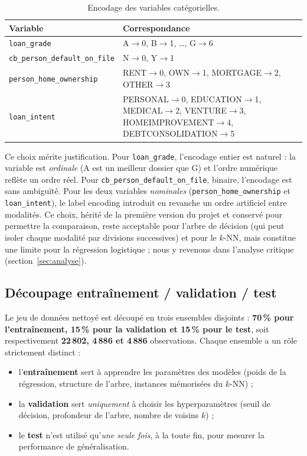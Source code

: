 \begin{table}[H]
  \centering
  \caption{Encodage des variables catégorielles.}
  \label{tab:encodage}
  \small
  \begin{tabular}{lp{8.5cm}}
    \toprule
    \textbf{Variable} & \textbf{Correspondance} \\
    \midrule
    \texttt{loan\_grade} & A$\to$0, B$\to$1, \ldots, G$\to$6 \\
    \texttt{cb\_person\_default\_on\_file} & N$\to$0, Y$\to$1 \\
    \texttt{person\_home\_ownership} & RENT$\to$0, OWN$\to$1, MORTGAGE$\to$2, OTHER$\to$3 \\
    \texttt{loan\_intent} & PERSONAL$\to$0, EDUCATION$\to$1, MEDICAL$\to$2,
      VENTURE$\to$3, HOMEIMPROVEMENT$\to$4, DEBTCONSOLIDATION$\to$5 \\
    \bottomrule
  \end{tabular}
\end{table}

Ce choix mérite justification. Pour \texttt{loan\_grade}, l'encodage entier est
naturel : la variable est \emph{ordinale} (A est un meilleur dossier que G) et
l'ordre numérique reflète un ordre réel. Pour
\texttt{cb\_person\_default\_on\_file}, binaire, l'encodage est sans ambiguïté.
Pour les deux variables \emph{nominales} (\texttt{person\_home\_ownership} et
\texttt{loan\_intent}), le label encoding introduit en revanche un ordre
artificiel entre modalités. Ce choix, hérité de la première version du projet
et conservé pour permettre la comparaison, reste acceptable pour l'arbre de
décision (qui peut isoler chaque modalité par divisions successives) et pour le
$k$-NN, mais constitue une limite pour la régression logistique ; nous y
revenons dans l'analyse critique (section~\ref{sec:analyse}).

\subsection{Découpage entraînement / validation / test}

Le jeu de données nettoyé est découpé en trois ensembles disjoints :
\textbf{70\,\% pour l'entraînement, 15\,\% pour la validation et 15\,\% pour le
test}, soit respectivement \textbf{22\,802, 4\,886 et 4\,886} observations.
Chaque ensemble a un rôle strictement distinct :

\begin{itemize}
  \item l'\textbf{entraînement} sert à apprendre les paramètres des modèles
    (poids de la régression, structure de l'arbre, instances mémorisées du
    $k$-NN) ;
  \item la \textbf{validation} sert \emph{uniquement} à choisir les
    hyperparamètres (seuil de décision, profondeur de l'arbre, nombre de
    voisins $k$) ;
  \item le \textbf{test} n'est utilisé qu'\emph{une seule fois}, à la toute
    fin, pour mesurer la performance de généralisation.
\end{itemize}

